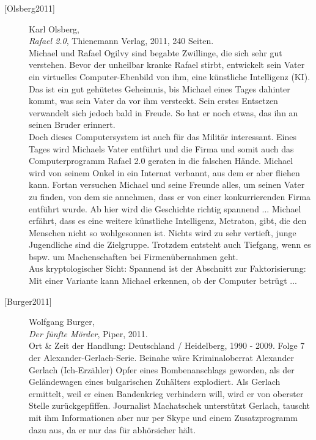 \begin{description}
\item[\textrm{[Olsberg2011]}] 
    Karl Olsberg,\\
    {\em Rafael 2.0}, Thienemann Verlag, 2011, 240 Seiten.\\
    Michael und Rafael Ogilvy sind begabte Zwillinge, die sich sehr gut verstehen.
    Bevor der unheilbar kranke Rafael stirbt, entwickelt sein Vater ein virtuelles
    Computer-Ebenbild von ihm, eine künstliche Intelligenz (KI). Das ist ein gut
    gehütetes Geheimnis, bis Michael eines Tages dahinter kommt, was sein Vater da vor
    ihm versteckt. Sein erstes Entsetzen verwandelt sich jedoch bald in Freude.
    So hat er noch etwas, das ihn an seinen Bruder erinnert.\\
    Doch dieses Computersystem ist auch für das Militär interessant.
    Eines Tages wird Michaels Vater entführt und die
    Firma und somit auch das Computerprogramm Rafael 2.0 geraten in die falschen Hände.
    Michael wird von seinem Onkel in ein Internat verbannt, aus dem er aber fliehen kann.
    Fortan versuchen Michael und seine Freunde alles, um seinen Vater zu finden, von dem
    sie annehmen, dass er von einer konkurrierenden Firma entführt wurde. Ab hier wird
    die Geschichte richtig spannend ...
    Michael erfährt, dass es eine weitere künstliche Intelligenz, Metraton, gibt,
    die den Menschen nicht so wohlgesonnen ist.
    Nichts wird zu sehr vertieft, junge Jugendliche sind die Zielgruppe.
    Trotzdem entsteht auch Tiefgang, wenn es bspw. um Machenschaften bei Firmenübernahmen
    geht.\\
    Aus kryptologischer Sicht: Spannend ist der Abschnitt zur Faktorisierung: Mit einer
    Variante kann Michael erkennen, ob der Computer betrügt ...\\



\item[\textrm{[Burger2011]}] 
    Wolfgang Burger, \\
    {\em Der fünfte Mörder}, Piper, 2011. \\
    Ort \& Zeit der Handlung: Deutschland / Heidelberg, 1990 - 2009.
    Folge 7 der Alexander-Gerlach-Serie.
    Beinahe wäre Kriminaloberrat Alexander Gerlach (Ich-Erzähler) Opfer eines
    Bombenanschlags geworden, als der Geländewagen eines bulgarischen Zuhälters explodiert.
    Als Gerlach ermittelt, weil er einen Bandenkrieg verhindern will, wird er von oberster
    Stelle zurückgepfiffen.
    Journalist Machatschek unterstützt Gerlach, tauscht mit ihm Informationen aber nur
    per Skype und einem Zusatzprogramm dazu aus, da er nur das für abhörsicher hält.\\




\end{description}
